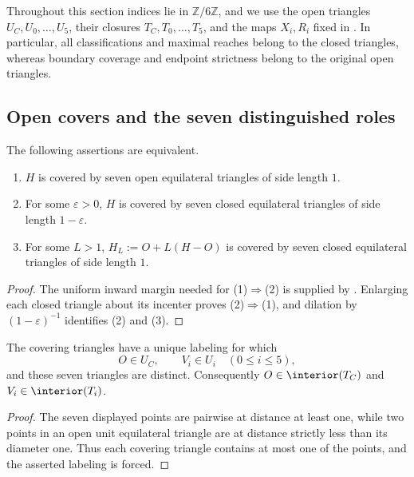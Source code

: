 Throughout this section indices lie in $\mathbb Z/6\mathbb Z$, and we use the
open triangles $U_C,U_0,\ldots,U_5$, their closures $T_C,T_0,\ldots,T_5$,
and the maps $X_i,R_i$ fixed in .  In particular,
all classifications and maximal reaches belong to the closed triangles,
whereas boundary coverage and endpoint strictness belong to the original
open triangles.

\subsection{Open covers and the seven distinguished roles}

\begin{proposition}
\label{prop:open-closed-scaled}
The following assertions are equivalent.
\begin{enumerate}
 \item $H$ is covered by seven open equilateral triangles of side length $1$.
 \item For some $\varepsilon>0$, $H$ is covered by seven closed equilateral
 triangles of side length $1-\varepsilon$.
 \item For some $L>1$, $H_L:=O+L(H-O)$ is covered by seven closed equilateral
 triangles of side length $1$.
\end{enumerate}
\end{proposition}

\begin{proof}
The uniform inward margin needed for (1)$\Rightarrow$(2) is supplied by
.  Enlarging each closed triangle about
its incenter proves (2)$\Rightarrow$(1), and dilation by
$(1-\varepsilon)^{-1}$ identifies (2) and (3).
\end{proof}

\begin{lemma}
\label{lem:distinct-roles}
The covering triangles have a unique labeling for which
\[
 O\in U_C,
 \qquad
 V_i\in U_i\quad(0\le i\le5),
\]
and these seven triangles are distinct.  Consequently
$O\in\interior(T_C)$ and $V_i\in\interior(T_i)$.
\end{lemma}

\begin{proof}
The seven displayed points are pairwise at distance at least one, while two
points in an open unit equilateral triangle are at distance strictly less
than its diameter one.  Thus each covering triangle contains at most one of
the points, and the asserted labeling is forced.
\end{proof}

